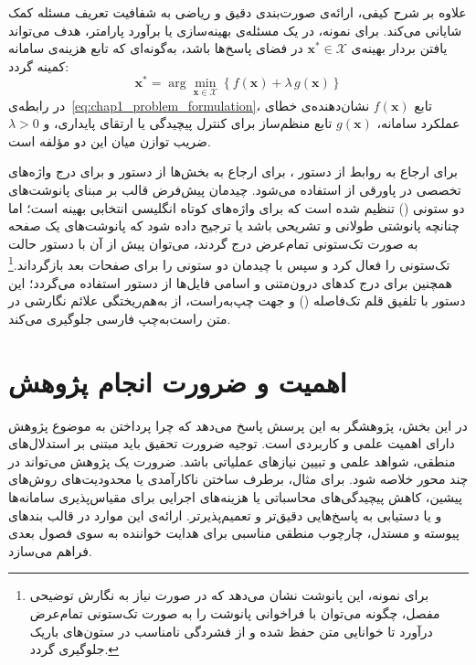 علاوه بر شرح کیفی، ارائه‌ی صورت‌بندی دقیق و ریاضی به شفافیت تعریف مسئله کمک شایانی می‌کند. برای نمونه، در یک مسئله‌ی بهینه‌سازی یا برآورد پارامتر، هدف می‌تواند یافتن بردار بهینه‌ی $\mathbf{x}^* \in \mathcal{X}$ در فضای پاسخ‌ها باشد، به‌گونه‌ای که تابع هزینه‌ی سامانه کمینه گردد:
\begin{equation}\label{eq:chap1_problem_formulation}
    \mathbf{x}^* = \arg\min_{\mathbf{x} \in \mathcal{X}} \left\{ f(\mathbf{x}) + \lambda \, g(\mathbf{x}) \right\}
\end{equation}
در رابطه‌ی~\eqref{eq:chap1_problem_formulation}، تابع $f(\mathbf{x})$ نشان‌دهنده‌ی خطای عملکرد سامانه، $g(\mathbf{x})$ تابع منظم‌ساز برای کنترل پیچیدگی یا ارتقای پایداری، و $\lambda > 0$ ضریب توازن میان این دو مؤلفه است.

\normalfootnotes{}
برای ارجاع به روابط از دستور ، برای ارجاع به بخش‌ها از دستور  و برای درج واژه‌های تخصصی در پاورقی از  استفاده می‌شود. چیدمان پیش‌فرض قالب بر مبنای پانوشت‌های دو ستونی () تنظیم شده است که برای واژه‌های کوتاه انگلیسی انتخابی بهینه است؛ اما چنانچه پانوشتی طولانی و تشریحی باشد یا ترجیح داده شود که پانوشت‌های یک صفحه به صورت تک‌ستونی تمام‌عرض درج گردند، می‌توان پیش از آن با دستور  حالت تک‌ستونی را فعال کرد و سپس با  چیدمان دو ستونی را برای صفحات بعد بازگرداند.\footnote{برای نمونه، این پانوشت نشان می‌دهد که در صورت نیاز به نگارش توضیحی مفصل، چگونه می‌توان با فراخوانی  پانوشت را به صورت تک‌ستونی تمام‌عرض درآورد تا خوانایی متن حفظ شده و از فشردگی نامناسب در ستون‌های باریک جلوگیری گردد.} همچنین برای درج کدهای درون‌متنی و اسامی فایل‌ها از دستور  استفاده می‌گردد؛ این دستور با تلفیق قلم تک‌فاصله () و جهت چپ‌به‌راست، از به‌هم‌ریختگی علائم نگارشی در متن راست‌به‌چپ فارسی جلوگیری می‌کند.
\twocolumnfootnotes{}


\section{اهمیت و ضرورت انجام پژوهش}\label{sec:1-2}

در این بخش، پژوهشگر به این پرسش پاسخ می‌دهد که چرا پرداختن به موضوع پژوهش دارای اهمیت علمی و کاربردی است. توجیه ضرورت تحقیق باید مبتنی بر استدلال‌های منطقی، شواهد علمی و تبیین نیازهای عملیاتی باشد. ضرورت یک پژوهش می‌تواند در چند محور خلاصه شود. برای مثال، برطرف ساختن ناکارآمدی یا محدودیت‌های روش‌های پیشین، کاهش پیچیدگی‌های محاسباتی یا هزینه‌های اجرایی برای مقیاس‌پذیری سامانه‌ها و یا دستیابی به پاسخ‌هایی دقیق‌تر و تعمیم‌پذیرتر. ارائه‌ی این موارد در قالب بندهای پیوسته و مستدل، چارچوب منطقی مناسبی برای هدایت خواننده به سوی فصول بعدی فراهم می‌سازد.


